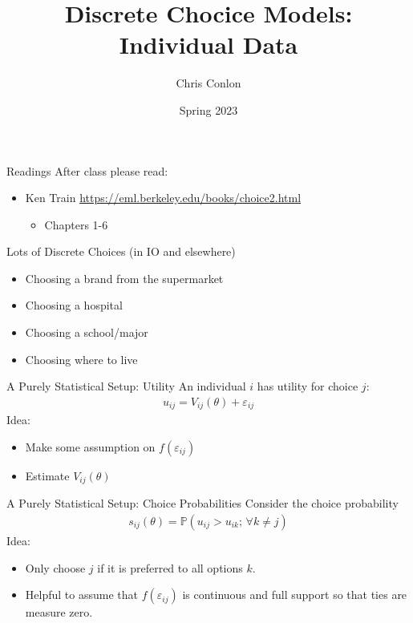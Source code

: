 
\title{Discrete Chocice Models: Individual Data}
\author{Chris Conlon}

\date{Spring 2023}



\frame{\titlepage}


\begin{frame}{Readings}
After class please read:
\begin{itemize}
\item Ken Train \url{https://eml.berkeley.edu/books/choice2.html}
\begin{itemize}
\item Chapters 1-6
\end{itemize}
\end{itemize}
\end{frame}




\begin{frame}{Lots of Discrete Choices (in IO and elsewhere)}
\begin{itemize}
\item Choosing a brand from the supermarket
\item Choosing a hospital
\item Choosing a school/major
\item Choosing where to live
\end{itemize}
\end{frame}



\begin{frame}{A Purely Statistical Setup: Utility}
An individual $i$ has utility for choice $j$:
\begin{align*}
u_{ij} = V_{ij}(\theta) + \varepsilon_{ij}
\end{align*}
Idea:
\begin{itemize}
\item Make some assumption on $f(\varepsilon_{ij})$
\item Estimate $V_{ij}(\theta)$
\end{itemize}
\end{frame}

\begin{frame}{A Purely Statistical Setup: Choice Probabilities}
Consider the \alert{choice probability}
\begin{align*}
s_{ij}(\theta)=\mathbb{P}(u_{ij} > u_{ik};\, \forall k \neq j)
\end{align*}
Idea:
\begin{itemize}
\item Only choose $j$ if it is preferred to all options $k$.
\item Helpful to assume that $f(\varepsilon_{ij})$ is continuous and full support so that ties are measure zero.
\end{itemize}
\end{frame}


